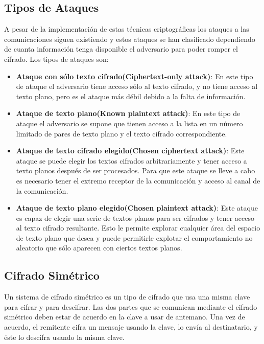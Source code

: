 \subsection{Tipos de Ataques}
A  pesar  de  la  implementación  de  estas  técnicas  criptográficas  los  ataques  a  las comunicaciones  siguen  existiendo  y  estos  ataques  se  han  clasificado  dependiendo  de 
cuanta  información  tenga  disponible  el  adversario  para  poder  romper  el  cifrado.\cite{at} Los tipos de ataques son:
\begin{itemize}
 \item \textbf{Ataque con sólo texto cifrado(Ciphertext-only  attack)}: En este tipo de ataque el adversario tiene acceso sólo al texto cifrado, y no tiene acceso al texto plano, pero es el ataque más débil debido a la falta de información.
 \item \textbf{Ataque de texto plano(Known plaintext attack)}: En este tipo de ataque el adversario se supone que tienen acceso a la lista en un número limitado de pares de texto plano y el texto cifrado correspondiente.
 \item \textbf{Ataque de texto cifrado elegido(Chosen ciphertext attack)}: Este ataque se puede elegir los textos cifrados arbitrariamente y tener acceso a texto planos después de ser procesados. Para que este ataque se lleve a cabo es necesario tener el extremo receptor de la comunicación y acceso al canal de la comunicación.
 \item \textbf{Ataque de texto plano elegido(Chosen plaintext attack)}: Este ataque es capaz de elegir una serie de textos planos para ser cifrados y tener acceso al texto cifrado resultante. Esto le permite explorar cualquier área del espacio de  texto plano que desea y puede permitirle explotar el comportamiento no aleatorio que sólo aparecen con ciertos textos planos.
\end{itemize}




\subsection{Cifrado Simétrico}
Un sistema de cifrado simétrico es un tipo de cifrado que usa una misma clave para cifrar y para descifrar. Las dos partes que se comunican mediante el cifrado simétrico deben estar de acuerdo en la clave a usar de antemano. Una vez de acuerdo, el remitente cifra un mensaje usando la clave, lo envía al destinatario, y éste lo descifra usando la misma clave.\cite{sime}\\


